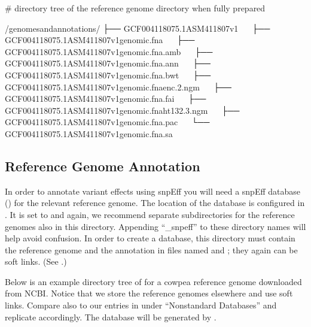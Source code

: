 \documentclass[letterpaper,10pt,english]{sphinxhowto}
\begin{document}
\# directory tree of the reference genome directory when fully prepared

\begin{sphinxVerbatim}[commandchars=\\\{\}]
\PYGZti{}/genomes\PYGZus{}and\PYGZus{}annotations/
├── GCF\PYGZus{}004118075.1\PYGZus{}ASM411807v1
   ├── GCF\PYGZus{}004118075.1\PYGZus{}ASM411807v1\PYGZus{}genomic.fna
   ├── GCF\PYGZus{}004118075.1\PYGZus{}ASM411807v1\PYGZus{}genomic.fna.amb
   ├── GCF\PYGZus{}004118075.1\PYGZus{}ASM411807v1\PYGZus{}genomic.fna.ann
   ├── GCF\PYGZus{}004118075.1\PYGZus{}ASM411807v1\PYGZus{}genomic.fna.bwt
   ├── GCF\PYGZus{}004118075.1\PYGZus{}ASM411807v1\PYGZus{}genomic.fna\PYGZhy{}enc.2.ngm
   ├── GCF\PYGZus{}004118075.1\PYGZus{}ASM411807v1\PYGZus{}genomic.fna.fai
   ├── GCF\PYGZus{}004118075.1\PYGZus{}ASM411807v1\PYGZus{}genomic.fna\PYGZhy{}ht\PYGZhy{}13\PYGZhy{}2.3.ngm
   ├── GCF\PYGZus{}004118075.1\PYGZus{}ASM411807v1\PYGZus{}genomic.fna.pac
   └── GCF\PYGZus{}004118075.1\PYGZus{}ASM411807v1\PYGZus{}genomic.fna.sa
\end{sphinxVerbatim}


\subsection{Reference Genome Annotation}
\label{\detokenize{index:reference-genome-annotation}}
In order to annotate variant effects using snpEff you will need a snpEff database () for the relevant reference genome. The location of the  database is configured in . It is set to  and again, we recommend separate subdirectories for the reference genomes also in this directory. Appending “\_snpeff” to these directory names will help avoid confusion. In order to create a  database, this  directory must contain the reference genome and the annotation in files named  and ; they again can be soft links. (See .)

Below is an example directory tree of  for a cowpea reference genome downloaded from NCBI. Notice that we store the reference genomes elsewhere and use soft links. Compare also to our entries in  under “Non\sphinxhyphen{}standard Databases” and replicate accordingly. The database  will be generated by .
\end{document}
